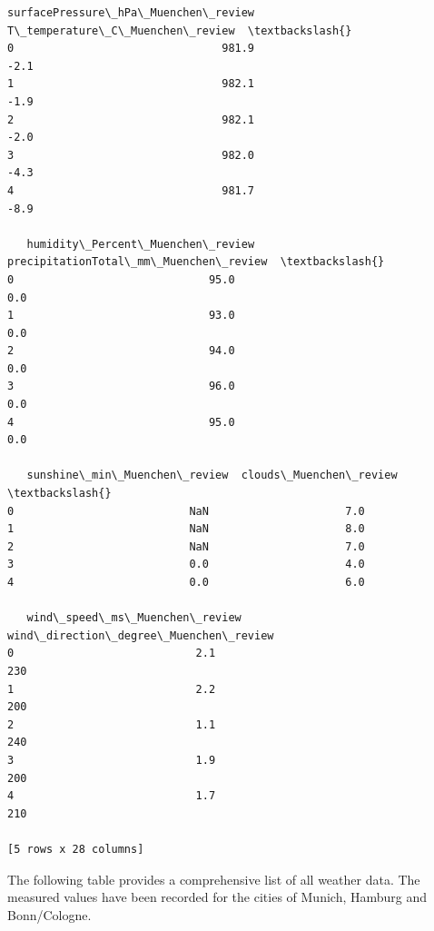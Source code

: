 \documentclass[a4paper]{article}
\begin{document}
\begin{small}
\begin{Verbatim}[commandchars=\\\{\}]
   surfacePressure\_hPa\_Muenchen\_review  T\_temperature\_C\_Muenchen\_review  \textbackslash{}
0                                981.9                             -2.1
1                                982.1                             -1.9
2                                982.1                             -2.0
3                                982.0                             -4.3
4                                981.7                             -8.9

   humidity\_Percent\_Muenchen\_review  precipitationTotal\_mm\_Muenchen\_review  \textbackslash{}
0                              95.0                                    0.0
1                              93.0                                    0.0
2                              94.0                                    0.0
3                              96.0                                    0.0
4                              95.0                                    0.0

   sunshine\_min\_Muenchen\_review  clouds\_Muenchen\_review  \textbackslash{}
0                           NaN                     7.0
1                           NaN                     8.0
2                           NaN                     7.0
3                           0.0                     4.0
4                           0.0                     6.0

   wind\_speed\_ms\_Muenchen\_review  wind\_direction\_degree\_Muenchen\_review
0                            2.1                                    230
1                            2.2                                    200
2                            1.1                                    240
3                            1.9                                    200
4                            1.7                                    210

[5 rows x 28 columns]
    \end{Verbatim}
\end{small}

    The following table provides a comprehensive list of all weather data.
The measured values have been recorded for the cities of Munich, Hamburg
and Bonn/Cologne.
\end{document}

